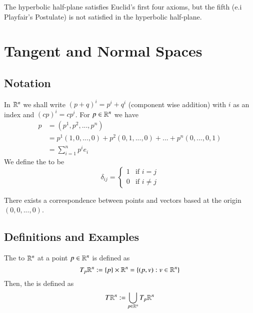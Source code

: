 \documentclass[12pt]{report}
\begin{document}
\begin{rmk}{}{}
    The hyperbolic half-plane satisfies Euclid's first four axioms, but the fifth (e.i Playfair's Postulate) is not satisfied in the hyperbolic half-plane. 
\end{rmk}

\chapter{Tangent and Normal Spaces}

\section{Notation}

\begin{rmk}{}{}
    In $\mathbb R^n$ we shall write $(p+q)^i = p^i+q^i$ (component wise addition) with $i$ as an index and $(cp)^i = cp^i$. For $p \in \mathbb R^n$ we have\begin{align*}
        p &= (p^1,p^2,...,p^n) \\
        &=p^1(1,0,...,0) + p^2(0,1,...,0) + ... + p^n(0,...,0,1) \\
        &= \sum\limits_{i=1}^np^ie_i
    \end{align*}
    We define the  to be \begin{equation}
        \delta_{ij} = \left\{\begin{array}{ll} 1 & \text{if } i = j \\ 0 & \text{if } i \neq j \end{array}\right.
    \end{equation}
\end{rmk}

\begin{rmk}{}{}
    There exists a correspondence between points and vectors based at the origin $(0,0,...,0)$.
\end{rmk}

\section{Definitions and Examples}

\begin{defn}{}{}
    The  to $\mathbb R^n$ at a point $p \in \mathbb R^n$ is defined as \begin{equation}
        T_p\mathbb R^n :=\{p\}\times \mathbb R^n = \{(p,v):v\in\mathbb R^n\}
    \end{equation} 
    Then, the  is defined as \begin{equation}
        T\mathbb R^n := \bigcup_{p \in \mathbb R^n}T_p\mathbb R^n
    \end{equation}
\end{defn}
\end{document}
